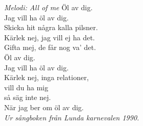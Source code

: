 {\footnotesize\textit{Melodi: All of me}}
\vspace{10pt}
Öl av dig.\\
Jag vill ha öl av dig.\\
Skicka hit några kalla pilsner.\\
Kärlek nej, jag vill ej ha det.\\
Gifta mej, de får nog va’ det.\\
Öl av dig.\\
Jag vill ha öl av dig.\\
Kärlek nej, inga relationer,\\
vill du ha mig\\
så säg inte nej.\\
När jag ber om öl av dig.\\
\vspace{10pt}
{\footnotesize\textit{Ur sångboken från Lunda karnevalen 1990.}}
